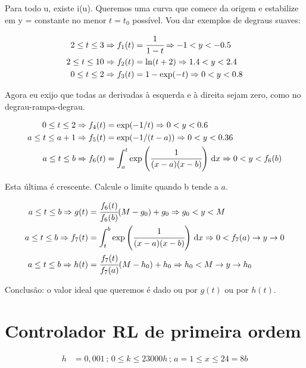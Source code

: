 \documentclass[12pt]{article}
\begin{document}
Para todo u, existe i(u). Queremos uma curva que comece da origem e estabilize em y = constante no menor $t = t_0$ poss\'ivel. Vou dar exemplos de degraus suaves:

\begin{align}
  2 \le t \le 3 \Rightarrow f_1(t) &= \cfrac{1}{1 - t} \Rightarrow -1 < y < -0.5 \\
  2 \le t \le 10 \Rightarrow f_2(t) &= \ln(t + 2) \Rightarrow 1.4 < y < 2.4 \\
  0 \le t \le 2 \Rightarrow f_3(t) &= 1 - \exp(-t) \Rightarrow 0 < y < 0.8
\end{align}

Agora eu exijo que todas as derivadas \`a esquerda e \`a direita sejam zero, como no degrau-rampa-degrau.

\begin{align}
  0 \le t \le 2 \Rightarrow f_4(t) &= \exp(-1/t) \Rightarrow 0 < y < 0.6 \\
  a \le t \le a + 1 \Rightarrow f_5(t) &= \exp(-1/(t - a)) \Rightarrow 0 < y < 0.36 \\
  a \le t \le b \Rightarrow f_6(t) &= \int_a^t \exp\left(\cfrac{1}{(x - a) (x - b)}\right)\,\mathrm{d}x \Rightarrow 0 < y < f_6(b)
\end{align}

Esta \'ultima \'e crescente. Calcule o limite quando b tende a $a$.

\begin{align}
  a \le t \le b \Rightarrow g(t) &= \cfrac{f_6(t)}{f_6(b)} (M - g_0) + g_0 \Rightarrow g_0 < y < M \\
  a \le t \le b \Rightarrow f_7(t) &= \int_t^b \exp\left(\cfrac{1}{(x - a) (x - b)}\right)\,\mathrm{d}x \Rightarrow 0 < f_7(a) \to y \to 0 \\
  a \le t \le b \Rightarrow h(t) &= \cfrac{f_7(t)}{f_7(a)} (M - h_0) + h_0 \Rightarrow h_0 < M \to y \to h_0
\end{align}

Conclus\~ao: o valor ideal que queremos \'e dado ou por $g(t)$ ou por $h(t)$.

\section{Controlador RL de primeira ordem}

\begin{align}
  h &= 0,001\,;\,0 \le k \le 23000 h\,;\,a = 1 \le x \le 24 = 8b
\end{align}
\end{document}
